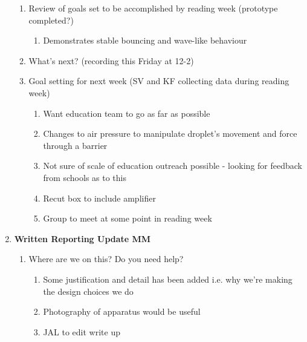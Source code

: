 \begin{enumerate}
\begin{enumerate}
\item  Review of goals set to be accomplished by reading week (prototype completed?)

\begin{enumerate}
\item  Demonstrates stable bouncing and wave-like behaviour
\end{enumerate}

\item  What's next? (recording this Friday at 12-2)

\item  Goal setting for next week (SV and KF collecting data during reading week)

\begin{enumerate}
\item  Want education team to go as far as possible

\item  Changes to air pressure to manipulate droplet's movement and force through a barrier

\item  Not sure of scale of education outreach possible - looking for feedback from schools as to this

\item  Recut box to include amplifier

\item  Group to meet at some point in reading week
\end{enumerate}

\end{enumerate}

\item  \textbf{Written Reporting Update MM}

\begin{enumerate}
\item Where are we on this? Do you need help?

\begin{enumerate}
\item  Some justification and detail has been added i.e. why we're making the design choices we do

\item  Photography of apparatus would be useful

\item  JAL to edit write up
\end{enumerate}

\end{enumerate}


\end{enumerate}

